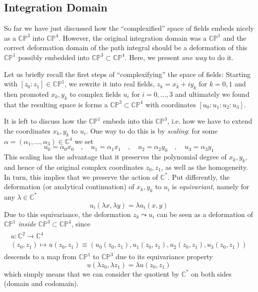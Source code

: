 \documentclass[a4paper,11pt]{article}
\theoremstyle{definition}
\newcommand{\CC}{\mathbb{C}}
\newcommand{\CP}{\mathbb{CP}}
\begin{document}
\subsection{Integration Domain}
So far we have just discussed how the ``complexified'' space of fields embeds nicely as a $\CP^3$ into $\CP^4$. 
However, the original integration domain was a $\CP^1$ and the correct deformation domain of the path integral should be a deformation of this $\CP^1$ possibly embedded into $\CP^3 \subset \CP^4$. 
Here, we present \emph{one way} to do it.

Let us briefly recall the first steps of ``complexifying'' the space of fields: Starting with $[z_0:z_1] \in \CP^1$, we rewrite it into real fields, $z_k = x_k + i y_k$ for $k = 0,1$ and then promoted $x_k,y_k$ to complex fields $u_i$ for $i=0,\dots,3$ and ultimately we found that the resulting space is forms a $\CP^3 \subset \CP^4$ with coordinates $[u_0:u_1:u_2:u_3]$.

It is left to discuss how the $\CP^1$ embeds into this $\CP^3$, i.e. how we have to extend the coordinates $x_k,y_k$ to $u_i$. 
One way to do this is by \emph{scaling}: for some $\alpha = (\alpha_1, \dots, \alpha_3) \in \CC^4$ we set
\begin{equation}
  u_0 = \alpha_0 x_0  \quad , \quad u_1 = \alpha_1 x_1 \quad , \quad u_2 =  \alpha_2 y_0 \quad , \quad u_3 = \alpha_3 y_1 
  \label{eq:toy_deform_contour}
\end{equation}
This scaling has the advantage that it preserves the polynomial degree of $x_k,y_k$, and hence of the original complex coordinates $z_0,z_1$, as well as the homogeneity.
In turn, this implies that we preserve the action of $\CC^*$. 
Put differently, the deformation (or analytical continuation) of $x_k,y_k$ to $u_i$ is \emph{equivariant}, namely for any $\lambda \in \CC^*$
\begin{equation}
  u_i(\lambda x,\lambda y) = \lambda u_i(x,y)
\end{equation}
Due to this equivariance, the deformation $z_k \leadsto u_i$ can be seen as a deformation of $\CP^1$ \emph{inside} $\CP^3 \subset \CP^4$, since 
\begin{equation}
  \begin{split}
    \begin{matrix}
      u \colon  \CC^2 \to \CC^4 \\
  (z_0,z_1) \mapsto u(z_0,z_1) \equiv (u_0(z_0,z_1),u_1(z_0,z_1),u_2(z_0,z_1),u_3(z_0,z_1))
\end{matrix}
\end{split}
\end{equation}
descends to a map from $\CP^1$ to $\CP^3$ due to its equivariance property 
\begin{equation}
  u(\lambda z_0,\lambda z_1) = \lambda u(z_0,z_1)
\end{equation}
which simply means that we can consider the quotient by $\CC^*$ on both sides (domain and codomain).
\end{document}
